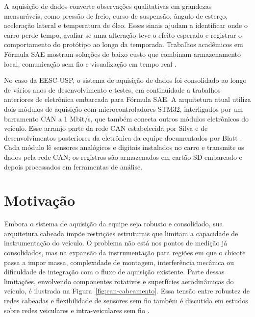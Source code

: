 A aquisição de dados converte observações qualitativas em grandezas mensuráveis,
como pressão de freio, curso de suspensão, ângulo de esterço, aceleração lateral e
temperatura de óleo. Esses sinais ajudam a identificar onde o carro perde tempo,
avaliar se uma alteração teve o efeito esperado e registrar o comportamento do
protótipo ao longo da temporada. Trabalhos acadêmicos em Fórmula SAE mostram
soluções de baixo custo que combinam armazenamento local, comunicação sem fio e
visualização em tempo real
\cite{stoffman2004_low_cost_racing_daq,visconti2019_formula_sae_telemetry,zanetti2013_formula_sae_wireless,lauro2021_formula_sae_telemetria}.

No caso da EESC-USP, o sistema de aquisição de dados foi consolidado ao longo de
vários anos de desenvolvimento e testes, em continuidade a trabalhos anteriores de
eletrônica embarcada para Fórmula SAE. A arquitetura atual utiliza dois módulos
de aquisição com microcontroladores STM32, interligados por um barramento CAN a
1 Mbit/s, que também conecta outros módulos eletrônicos do veículo. Esse arranjo
parte da rede CAN estabelecida por Silva e de desenvolvimentos posteriores da
eletrônica da equipe documentados por Blatt
\cite{silva2009_rede_can_formula_sae,blatt2020_aquisicao_formula_sae}. Cada módulo lê
sensores analógicos e digitais instalados no carro e transmite os dados pela rede
CAN; os registros são armazenados em cartão SD embarcado e depois processados em
ferramentas de análise.

\section{Motivação}

Embora o sistema de aquisição da equipe seja robusto e consolidado, sua arquitetura
cabeada impõe restrições estruturais que limitam a capacidade de instrumentação
do veículo. O problema não está nos pontos de medição já consolidados, mas na
expansão da instrumentação para regiões em que o chicote passa a impor massa,
complexidade de montagem, interferência mecânica ou dificuldade de integração
com o fluxo de aquisição existente. Parte dessas limitações, envolvendo
componentes rotativos e superfícies aerodinâmicas do veículo, é ilustrada na
Figura~\ref{fig:can-cabeamento}. Essa tensão entre robustez de redes cabeadas e
flexibilidade de sensores sem fio também é discutida em estudos sobre redes
veiculares e intra-veiculares sem fio
\cite{blatt2020_aquisicao_formula_sae,tavares2008_wsn_automobiles,rahman2017_intravehicular_wsn,hashemi2014_intracar_multihop_wsn}.

